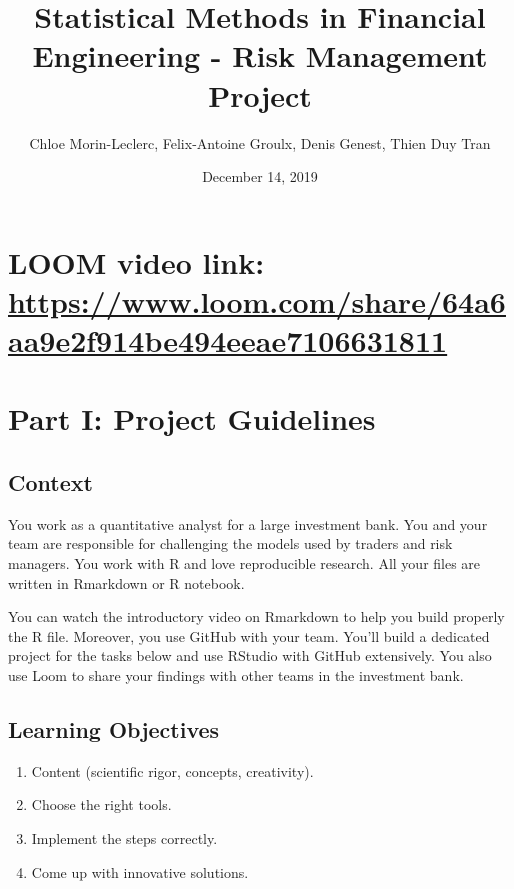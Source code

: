 \documentclass[]{article}
\title{Statistical Methods in Financial Engineering - Risk Management
Project}
\author{Chloe Morin-Leclerc, Felix-Antoine Groulx, Denis Genest,
Thien Duy Tran}
\date{December 14, 2019}
\providecommand{\tightlist}{%
  \setlength{\itemsep}{0pt}\setlength{\parskip}{0pt}}
\begin{document}
\maketitle

\hypertarget{loom-video-link-httpswww.loom.comshare64a6aa9e2f914be494eeae7106631811}{%
\section{\texorpdfstring{LOOM video link:
\url{https://www.loom.com/share/64a6aa9e2f914be494eeae7106631811}}{LOOM video link: https://www.loom.com/share/64a6aa9e2f914be494eeae7106631811}}\label{loom-video-link-httpswww.loom.comshare64a6aa9e2f914be494eeae7106631811}}

\hypertarget{part-i-project-guidelines}{%
\section{Part I: Project Guidelines}\label{part-i-project-guidelines}}

\hypertarget{context}{%
\subsection{Context}\label{context}}

You work as a quantitative analyst for a large investment bank. You and
your team are responsible for challenging the models used by traders and
risk managers. You work with R and love reproducible research. All your
files are written in Rmarkdown or R notebook.

You can watch the introductory video on Rmarkdown to help you build
properly the R file. Moreover, you use GitHub with your team. You'll
build a dedicated project for the tasks below and use RStudio with
GitHub extensively. You also use Loom to share your findings with other
teams in the investment bank.

\hypertarget{learning-objectives}{%
\subsection{Learning Objectives}\label{learning-objectives}}

\begin{enumerate}
\def\labelenumi{\arabic{enumi}.}
\tightlist
\item
  Content (scientific rigor, concepts, creativity).\\
\item
  Choose the right tools.\\
\item
  Implement the steps correctly.\\
\item
  Come up with innovative solutions.\\
\end{enumerate}
\end{document}

